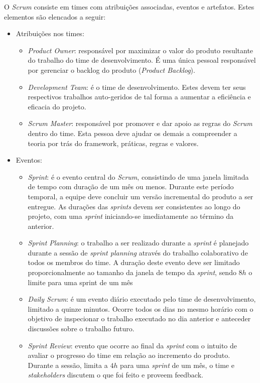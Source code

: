 O \textit{Scrum} consiste em times com atribuições associadas, eventos e artefatos. Estes elementos são elencados a seguir:
\begin{itemize}
    \item Atribuições nos times:
    \begin{itemize}
        \item \textit{Product Owner}: responsável por maximizar o valor do produto resultante do trabalho do time de desenvolvimento. É uma única pessoal responsável por gerenciar o backlog do produto (\textit{Product Backlog}).
        \item \textit{Development Team}: é o time de desenvolvimento. Estes devem ter seus respectivos trabalhos auto-geridos de tal forma a aumentar a eficiência e eficacia do projeto.
        \item \textit{Scrum Master}: responsável por promover e dar apoio as regras do \textit{Scrum} dentro do time. Esta pessoa deve ajudar os demais a compreender a teoria por trás do framework, práticas, regras e valores.
    \end{itemize}
    \item Eventos:
    \begin{itemize}
        \item \textit{Sprint}: é o evento central do \textit{Scrum}, consistindo de uma janela limitada de tempo com duração de um mês ou menos. Durante este período temporal, a equipe deve concluir um versão incremental do produto a ser entregue. As durações das \textit{sprints} devem ser consistentes ao longo do projeto, com uma \textit{sprint} iniciando-se imediatamente ao término da anterior.
        \item \textit{Sprint Planning}: o trabalho a ser realizado durante a \textit{sprint} é planejado durante a sessão de \textit{sprint planning} através do trabalho colaborativo de todos os membros do time. A duração deste evento deve ser limitado proporcionalmente ao tamanho da janela de tempo da \textit{sprint}, sendo $8h$ o limite para uma sprint de um mês
        \item \textit{Daily Scrum}: é um evento diário executado pelo time de desenvolvimento, limitado a quinze minutos. Ocorre todos os dias no mesmo horário com o objetivo de inspecionar o trabalho executado no dia anterior e anteceder discussões sobre o trabalho futuro.
        \item \textit{Sprint Review}: evento que ocorre ao final da \textit{sprint} com o intuito de avaliar o progresso do time em relação ao incremento do produto. Durante a sessão, limita a $4h$ para uma \textit{sprint} de um mês, o time e \textit{stakeholders} discutem o que foi feito e proveem feedback.

\end{itemize}
\end{itemize}
